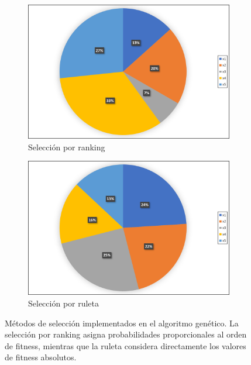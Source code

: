 \begin{figure}[!ht]
\centering
\begin{subfigure}[b]{0.45\textwidth}
    \includegraphics[width=\textwidth]{images/selecionrank.png}
    \caption{Selección por ranking}
    \label{fig:seleccion_ranking}
\end{subfigure}
\hfill
\begin{subfigure}[b]{0.45\textwidth}
    \includegraphics[width=\textwidth]{images/selecionruleta.png}
    \caption{Selección por ruleta}
    \label{fig:seleccion_ruleta}
\end{subfigure}
\caption{Métodos de selección implementados en el algoritmo genético. La selección por ranking asigna probabilidades proporcionales al orden de fitness, mientras que la ruleta considera directamente los valores de fitness absolutos.}
\label{fig:metodos_seleccion}
\end{figure}

